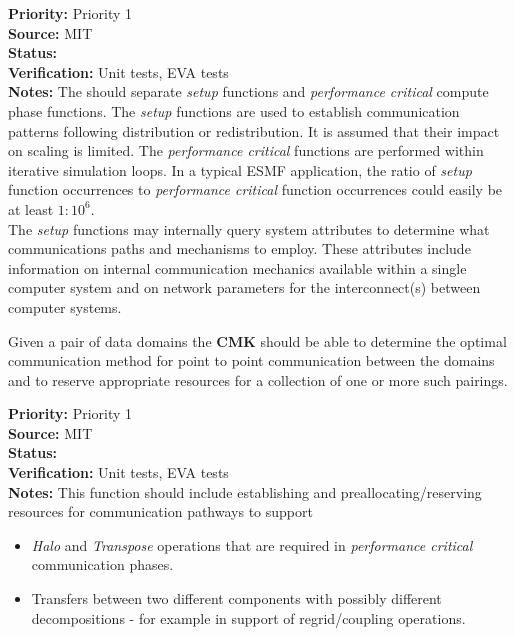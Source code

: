 

\begin{reqlist}
{\bf Priority:} Priority 1 \\
{\bf Source:}  MIT \\
{\bf Status:}  \\
{\bf Verification:} Unit tests, EVA tests \\
{\bf Notes:}
The {\bf \shortname} should separate {\it setup} functions
and {\it performance critical} compute phase functions. The {\it setup}
functions are used to establish communication patterns following
distribution or redistribution. It is assumed that their impact
on scaling is limited. The {\it performance critical} functions
are performed within iterative simulation loops. In a typical
ESMF application, the ratio of {\it setup} function occurrences
to {\it performance critical} function occurrences could easily be at least
$1:10^6$.\\
The {\bf \shortname} {\it setup} functions may internally query system attributes 
to determine what communications paths and mechanisms to employ. These
attributes include information on internal communication
mechanics available within a single computer system and on network 
parameters for the interconnect(s) between computer systems.
\end{reqlist}

Given a pair of data domains the {\bf CMK} should be able to determine the
optimal communication method for point to point communication
between the domains and to reserve appropriate resources for a collection of one
or more such pairings.
\begin{reqlist}
{\bf Priority:} Priority 1 \\
{\bf Source:}  MIT \\
{\bf Status:}  \\
{\bf Verification:} Unit tests, EVA tests \\
{\bf Notes:}
This function should include establishing and preallocating/reserving 
resources for communication pathways to support
\begin{itemize}
\item {\it Halo} and {\it Transpose} operations that are required in 
{\it performance critical} communication phases.
\item Transfers between two different components with possibly different decompositions -
for example in support of regrid/coupling operations.
\end{itemize}
\end{reqlist}

